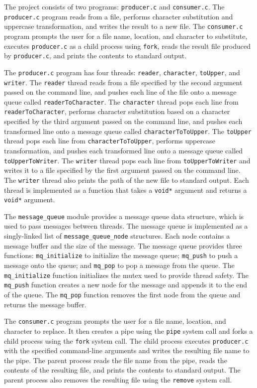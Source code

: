 \documentclass{article}
\begin{document}
The project consists of two programs: \texttt{producer.c} and \texttt{consumer.c}. The \texttt{producer.c} program reads from a file, performs character substitution and uppercase transformation, and writes the result to a new file. The \texttt{consumer.c} program prompts the user for a file name, location, and character to substitute, executes \texttt{producer.c} as a child process using \texttt{fork}, reads the result file produced by \texttt{producer.c}, and prints the contents to standard output.

The \texttt{producer.c} program has four threads: \texttt{reader}, \texttt{character}, \texttt{toUpper}, and \texttt{writer}. The \texttt{reader} thread reads from a file specified by the second argument passed on the command line, and pushes each line of the file onto a message queue called \texttt{readerToCharacter}. The \texttt{character} thread pops each line from \texttt{readerToCharacter}, performs character substitution based on a character specified by the third argument passed on the command line, and pushes each transformed line onto a message queue called \texttt{characterToToUpper}. The \texttt{toUpper} thread pops each line from \texttt{characterToToUpper}, performs uppercase transformation, and pushes each transformed line onto a message queue called \texttt{toUpperToWriter}. The \texttt{writer} thread pops each line from \texttt{toUpperToWriter} and writes it to a file specified by the first argument passed on the command line. The \texttt{writer} thread also prints the path of the new file to standard output. Each thread is implemented as a function that takes a \texttt{void*} argument and returns a \texttt{void*} argument.

The \texttt{message\_queue} module provides a message queue data structure, which is used to pass messages between threads. The message queue is implemented as a singly-linked list of \texttt{message\_queue\_node} structures. Each node contains a message buffer and the size of the message. The message queue provides three functions: \texttt{mq\_initialize} to initialize the message queue; \texttt{mq\_push} to push a message onto the queue; and \texttt{mq\_pop} to pop a message from the queue. The \texttt{mq\_initialize} function initializes the mutex used to provide thread safety. The \texttt{mq\_push} function creates a new node for the message and appends it to the end of the queue. The \texttt{mq\_pop} function removes the first node from the queue and returns the message buffer.

The \texttt{consumer.c} program prompts the user for a file name, location, and character to replace. It then creates a pipe using the \texttt{pipe} system call and forks a child process using the \texttt{fork} system call. The child process executes \texttt{producer.c} with the specified command-line arguments and writes the resulting file name to the pipe. The parent process reads the file name from the pipe, reads the contents of the resulting file, and prints the contents to standard output. The parent process also removes the resulting file using the \texttt{remove} system call.
\end{document}
